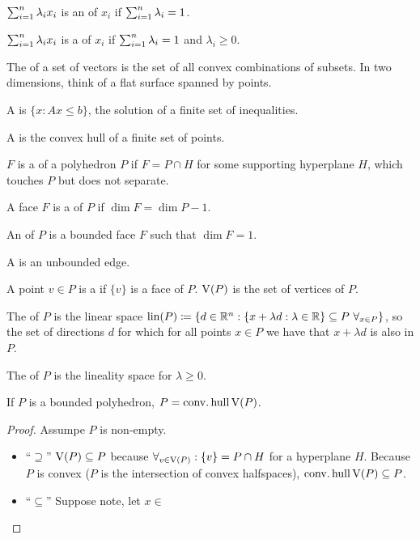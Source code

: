 \documentclass{exam}
\begin{document}
    \begin{define}

        $\sum_{i=1}^n \lambda_i x_i$ is an  of $x_i$ if $\sum_{i=1}^n \lambda_i = 1$.

        $\sum_{i=1}^n \lambda_i x_i$ is a  of $x_i$ if $\sum_{i=1}^n \lambda_i = 1$ and $\lambda_i \ge 0$.

        The  of a set of vectors is the set of all convex combinations of subsets.
        In two dimensions, think of a flat surface spanned by points.

        A  is $\{ x : Ax \le b \}$, the solution of a finite set of inequalities.

        A  is the convex hull of a finite set of points.

        $F$ is a  of a polyhedron $P$ if $F=P \cap H$ for some supporting hyperplane $H$, which touches $P$ but does not separate.

        A face $F$ is a  of $P$ if $\dim F = \dim P -1$.

        An  of $P$ is a bounded face $F$ such that $\dim F =1$.

        A  is an unbounded edge.

        A point $v \in P$ is a  if $\{v\}$ is a face of $P$. $\operatorname{\mathrm{V}}(P)$ is the set of vertices of $P$.

        The  of $P$ is the linear space $\lin(P) \coloneqq \{ d \in \reals^n : \{ x + \lambda d : \lambda \in \reals \} \subset P \ \forall_{x \in P} \}$, so the set of directions $d$ for which for all points $x \in P$ we have that $x + \lambda d$ is also in $P$.

        The  of $P$ is the lineality space for $\lambda \ge 0$.

    \end{define}
    \begin{theorem}
        If $P$ is a bounded polyhedron, $P = \operatorname{\mathop{conv.hull}} \operatorname{\mathrm{V}}(P)$.
    \end{theorem}
    \begin{proof}
        Assumpe $P$ is non-empty.
        \begin{itemize}
            \item ``$\supseteq$'' $\operatorname{\mathrm{V}}(P) \subseteq P$ because $\forall_{v \in \operatorname{\mathrm{V}}(P)} : \{ v\} = P \cap H$ for a hyperplane $H$.
            Because $P$ is convex ($P$ is the intersection of convex halfspaces), $\operatorname{\mathop{conv.hull}} \operatorname{\mathrm{V}}(P) \subseteq P$.
            \item ``$\subseteq$'' Suppose note, let $x \in   $
        \end{itemize}
    \end{proof}
\end{document}
